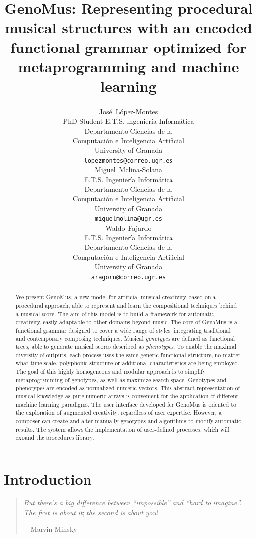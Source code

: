 \documentclass{article}
\title{GenoMus: Representing procedural musical structures with an encoded functional grammar optimized for metaprogramming and machine learning}
\author{
  Jos\'e~L\'opez-Montes\textsuperscript{\faEnvelopeO} \\
  PhD Student E.T.S. Ingenier\'{i}a Inform\'{a}tica\\
  Departamento Ciencias de la\\Computaci\'{o}n e Inteligencia Artificial\\
  University of Granada\\
  \texttt{lopezmontes@correo.ugr.es}\\   
  \And
  Miguel~Molina-Solana \\
  E.T.S. Ingenier\'{i}a Inform\'{a}tica\\
  Departamento Ciencias de la\\Computaci\'{o}n e Inteligencia Artificial\\
  University of Granada\\
  \texttt{miguelmolina@ugr.es} \\ 
  \And
  Waldo~Fajardo \\
  E.T.S. Ingenier\'{i}a Inform\'{a}tica\\
  Departamento Ciencias de la\\Computaci\'{o}n e Inteligencia Artificial\\
  University of Granada\\  
  \texttt{aragorn@correo.ugr.es} \\
}
\begin{document}
\maketitle

\begin{abstract}

 	
We present GenoMus, a new model for artificial musical creativity based on a procedural approach, able to represent and learn the compositional techniques behind a musical score. The aim of this model is to build a framework for automatic creativity, easily adaptable to other domains beyond music. The core of GenoMus is a functional grammar designed to cover a wide range of styles, integrating traditional and contemporary composing techniques. Musical \emph{genotypes} are defined as functional trees, able to generate musical scores described as \emph{phenotypes}. To enable the maximal diversity of outputs, each process uses the same generic functional structure, no matter what time scale, polyphonic structure or additional characteristics are being employed. The goal of this highly homogeneous and modular approach is to simplify metaprogramming of genotypes, as well as maximize search space. Genotypes and phenotypes are encoded as normalized numeric vectors. This abstract representation of musical knowledge as pure numeric arrays is convenient for the application of different machine learning paradigms. The user interface developed for GenoMus is oriented to the exploration of augmented creativity, regardless of user expertise. However, a composer can create and alter manually genotypes and algorithms to modify automatic results. The system allows the implementation of user-defined processes, which will expand the procedures library. 

\end{abstract}




\setcounter{tocdepth}{2}
\tableofcontents
\bigskip



\section{Introduction}

\begin{samepage}
\begin{quotation}
\textsl{But there's a big difference between ``impossible'' and ``hard to imagine''. The first is about} \emph{it}; \textsl{the second is about} \emph{you}!

---Marvin Minsky \cite{DBLP:journals/aim/Minsky82}
\end{quotation}
\end{samepage}
\end{document}
